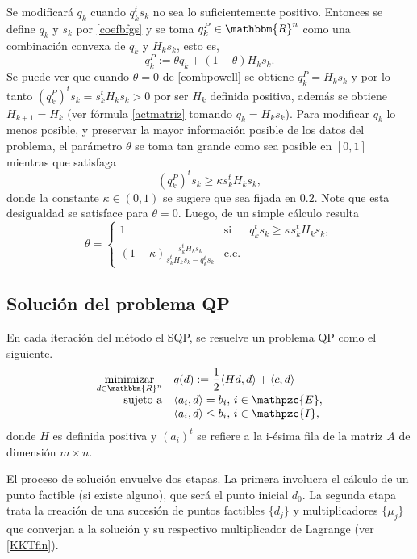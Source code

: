 \documentclass[a4paper,10pt]{book}
\newcommand{\R}{\mathbbm{R}}
\newcommand{\Rn}{\R^n}
\newcommand{\cI}{\mathpzc{I}}
\newcommand{\cE}{\mathpzc{E}}
\newcommand{\la}{\langle}
\newcommand{\ra}{\rangle}
\begin{document}
Se modificará $q_k$ cuando $q_k^ts_k$ no sea lo suficientemente positivo. Entonces se define $q_k$ y $s_k$ por \eqref{coefbfgs} y se toma $q_k^P\in\Rn$ como una combinación convexa de $q_k$ y $H_ks_k$, esto es,
\begin{equation}\label{combpowell}
    q_k^P:=\theta q_k+(1-\theta)H_ks_k.
\end{equation}
Se puede ver que cuando $\theta=0$ de \eqref{combpowell} se obtiene $q_k^P=H_ks_k$ y por lo tanto $(q_k^P)^ts_k=s_k^tH_ks_k>0$ por ser $H_k$ definida positiva, además se obtiene $H_{k+1}=H_k$ (ver fórmula \eqref{actmatriz} tomando $q_k=H_ks_k$). Para modificar $q_k$ lo menos posible, y preservar la mayor información posible de los datos del problema, el parámetro $\theta$ se toma tan grande como sea posible en $[0,1]$ mientras que satisfaga $$(q_k^P)^ts_k\geq\kappa s_k^tH_ks_k,$$ donde la constante $\kappa\in (0,1)$ se sugiere que sea fijada en $0.2$. Note que esta desigualdad se satisface para $\theta=0$. Luego, de un simple cálculo resulta 
\begin{equation*}
    \theta=\left\{
    \begin{array}{rcl}
    1&\mbox{si}&q_k^ts_k\geq\kappa s_k^tH_ks_k,\\
    (1-\kappa)\frac{s_k^tH_ks_k}{s_k^tH_ks_k-q_k^ts_k}&\mbox{c.c}.
    \end{array}
    \right.
\end{equation*}


\subsection{Solución del problema QP}

En cada iteración del método el SQP, se resuelve un problema QP como el siguiente.
\begin{equation}\label{probqp}
\begin{array}{rl}
\displaystyle \mathop{\mathrm{minimizar}}_{d\in\Rn} & \displaystyle q(d):=\frac{1}{2}\la Hd, d\ra + \la c ,d\ra  \\
\mathrm{sujeto \ a} & \la a_i,d\ra =b_i, \, i\in \cE,\\
                    & \la a_i,d\ra \leq b_i, \, i\in \cI,
\end{array}
\end{equation}
donde $H$ es definida positiva y $(a_i)^t$ se refiere a la i-ésima fila de la matriz $A$ de dimensión $m\times n$. 

El proceso de solución envuelve dos etapas. La primera involucra el cálculo de un punto factible (si existe alguno), que será el punto inicial $d_0$. La segunda etapa trata la creación de una sucesión de puntos factibles $\{d_j\}$ y multiplicadores $\{\mu_j\}$ que converjan a la solución y su respectivo multiplicador de Lagrange (ver \eqref{KKTfin}). 
\end{document}
